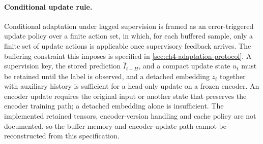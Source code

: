 \paragraph{Conditional update rule.} Conditional adaptation under lagged supervision is framed as an error-triggered update policy over a finite action set, in which, for each buffered sample, only a finite set of update actions is applicable once supervisory feedback arrives. The buffering constraint this imposes is specified in \cref{sec:ch4-adaptation-protocol}. A supervision key, the stored prediction $\hat I_{t+H}$, and a compact update state $u_t$ must be retained until the label is observed, and a detached embedding $z_t$ together with auxiliary history is sufficient for a head-only update on a frozen encoder. An encoder update requires the original input or another state that preserves the encoder training path; a detached embedding alone is insufficient. The implemented retained tensors, encoder-version handling and cache policy are not documented, so the buffer memory and encoder-update path cannot be reconstructed from this specification.

